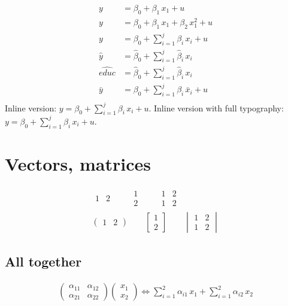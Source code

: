 \documentclass{article}			%
\theoremstyle{definition}
\theoremstyle{remark}
\begin{document}
\begin{align*}
y &= \beta_0 + \beta_1 \, x_1 + u \\
y &= \beta_0 + \beta_1 \, x_1 + \beta_2 \, x_1^2 + u \\
y &= \beta_0 + \sum_{i=1}^j \beta_i \, x_i + u \\
\hat{y} &= \hat{\beta}_0 + \sum_{i=1}^j \hat{\beta}_i \, x_i \\	%
\widehat{educ} &= \hat{\beta}_0 + \sum_{i=1}^j \hat{\beta}_i \, x_i \\	%
\bar{y} &= \beta_0 + \sum_{i=1}^j \beta_i \, \bar{x}_i + u \\		%
\end{align*}
Inline version: $y = \beta_0 + \sum_{i=1}^j \beta_i \, x_i + u$.
Inline version with full typography: $\displaystyle y = \beta_0 + \sum_{i=1}^j \beta_i \, x_i + u$.

\section{Vectors, matrices}

\begin{align*}
\begin{matrix}
1 & 2
\end{matrix} \qquad
\begin{matrix}
1 \\
2
\end{matrix}\qquad
\begin{matrix}
1 & 2 \\
1 & 2
\end{matrix} \\
\begin{pmatrix}
1 & 2
\end{pmatrix} \qquad
\begin{bmatrix}
1 \\
2
\end{bmatrix}\qquad
\begin{vmatrix}
1 & 2 \\
1 & 2
\end{vmatrix}
\end{align*}

\subsection*{All together}

\begin{align*}
\begin{pmatrix}
\alpha_{11} & \alpha_{12} \\
\alpha_{21} & \alpha_{22}
\end{pmatrix}
\begin{pmatrix}
x_1 \\
x_2
\end{pmatrix}
\iff
\sum_{i=1}^2 \alpha_{i1} \, x_1 + \sum_{i=1}^2 \alpha_{i2} \, x_2
\end{align*}
\end{document}
